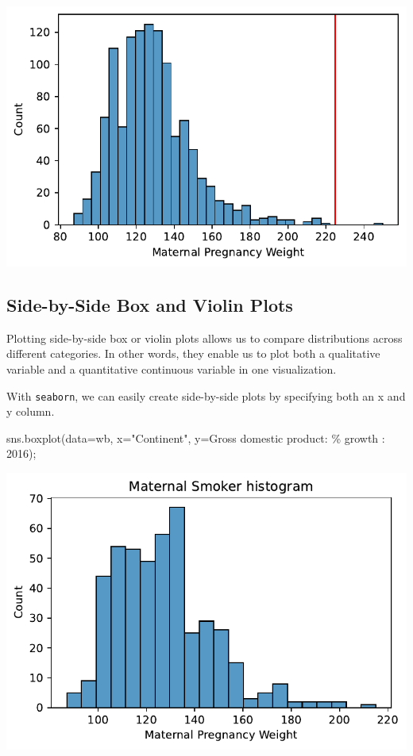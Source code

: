 \documentclass[
  letterpaper,
  DIV=11,
  numbers=noendperiod]{scrreprt}
\newenvironment{Shaded}{\begin{snugshade}}{\end{snugshade}}
\newcommand{\NormalTok}[1]{\textcolor[rgb]{0.00,0.23,0.31}{#1}}
\newcommand{\OperatorTok}[1]{\textcolor[rgb]{0.37,0.37,0.37}{#1}}
\newcommand{\SpecialCharTok}[1]{\textcolor[rgb]{0.37,0.37,0.37}{#1}}
\newcommand{\StringTok}[1]{\textcolor[rgb]{0.13,0.47,0.30}{#1}}
\begin{document}
\includegraphics{visualization_1/visualization_1_files/figure-pdf/cell-12-output-1.pdf}

\subsection{Side-by-Side Box and Violin
Plots}\label{side-by-side-box-and-violin-plots}

Plotting side-by-side box or violin plots allows us to compare
distributions across different categories. In other words, they enable
us to plot both a qualitative variable and a quantitative continuous
variable in one visualization.

With \texttt{seaborn}, we can easily create side-by-side plots by
specifying both an x and y column.

\begin{Shaded}
\begin{Highlighting}[]
\NormalTok{sns.boxplot(data}\OperatorTok{=}\NormalTok{wb, x}\OperatorTok{=}\StringTok{"Continent"}\NormalTok{, y}\OperatorTok{=}\StringTok{\textquotesingle{}Gross domestic product: }\SpecialCharTok{\% g}\StringTok{rowth : 2016\textquotesingle{}}\NormalTok{)}\OperatorTok{;}
\end{Highlighting}
\end{Shaded}

\includegraphics{visualization_1/visualization_1_files/figure-pdf/cell-13-output-1.pdf}
\end{document}
